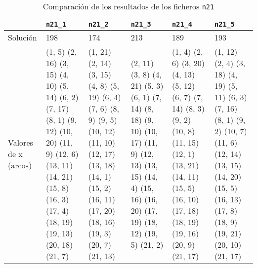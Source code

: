 \documentclass[a4paper,11pt]{article}
\begin{document}
\begin{enumerate}
\begin{table}[!htbp]
\label{results_100}
\centering
\begin{tabularx}{\textwidth}{|p{2cm}|X|X|X|X|X|}
\hline
& \texttt{n21\_1}	& \texttt{n21\_2}	& \texttt{n21\_3}	& \texttt{n21\_4}	& \texttt{n21\_5} \\ \hline
Solución	& 198	& 174	& 213	& 189	& 193	\\ \hline
Valores de x (arcos)	&  (1, 5) (2, 16) (3, 15) (4, 10) (5, 14) (6, 2) (7, 17) (8, 1) (9, 12) (10, 20) (11, 9) (12, 6) (13, 11) (14, 21) (15, 8) (16, 3) (17, 4) (18, 19) (19, 13) (20, 18) (21, 7)	& (1, 21) (2, 14) (3, 15) (4, 8) (5, 19) (6, 4) (7, 6) (8, 9) (9, 5) (10, 12) (11, 10) (12, 17) (13, 18) (14, 1) (15, 2) (16, 11) (17, 20) (18, 16) (19, 3) (20, 7) (21, 13)	& (2, 11) (3, 8) (4, 21) (5, 3) (6, 1) (7, 14) (8, 18) (9, 10) (10, 17) (11, 9) (12, 13) (13, 15) (14, 4) (15, 16) (16, 20) (17, 19) (18, 12) (19, 5) (21, 2)	& (1, 4) (2, 6) (3, 20) (4, 13) (5, 12) (6, 7) (7, 14) (8, 3) (9, 2) (10, 8) (11, 15) (12, 1) (13, 21) (14, 11) (15, 5) (16, 10) (17, 18) (18, 19) (19, 16) (20, 9) (21, 17)	& (1, 12) (2, 4) (3, 18) (4, 19) (5, 11) (6, 3) (7, 16) (8, 1) (9, 2) (10, 7) (11, 6) (12, 14) (13, 15) (14, 20) (15, 5) (16, 13) (17, 8) (18, 9) (19, 21) (20, 10) (21, 17)	\\ \hline
\end{tabularx}
\caption{Comparación de los resultados de los ficheros \texttt{n21}}
\end{table}

\end{enumerate}
\end{document}
